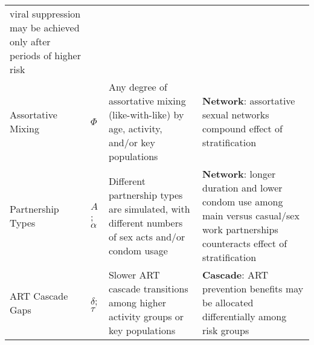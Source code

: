 \begin{tabular}{llp{.33\linewidth}p{.4\linewidth}}
  viral suppression may be achieved only after periods of higher risk
\\
  Assortative Mixing
& $\Phi$
& Any degree of assortative mixing (like-with-like) by age, activity, and/or key populations
& \textbf{Network}: assortative sexual networks compound effect of stratification \citep{Anderson1991}
\\
  Partnership Types
& $A$; $\alpha$
& Different partnership types are simulated, with different numbers of sex acts and/or condom usage \citep{Scorgie2012}
& \textbf{Network}: longer duration and lower condom use among main versus casual/sex work partnerships
  counteracts effect of stratification
\\
  ART Cascade Gaps
& $\delta$; $\tau$
& Slower ART cascade transitions among higher activity groups or key populations \citep{Hakim2018,Green2020}
& \textbf{Cascade}: ART prevention benefits may be allocated differentially among risk groups
\\
\bottomrule
\end{tabular}
